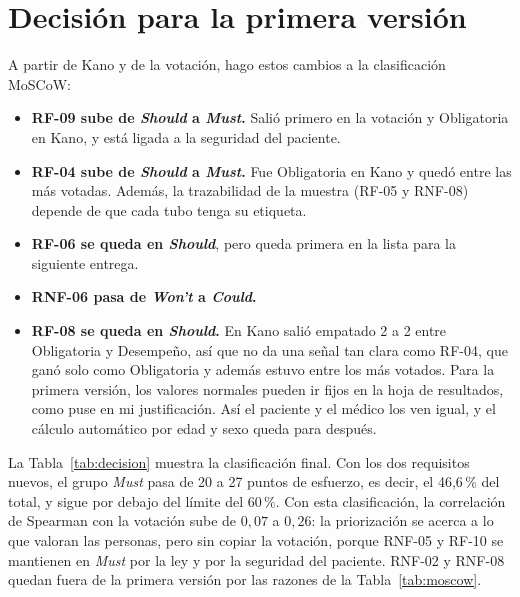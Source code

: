 \documentclass[11pt,a4paper]{article}
\begin{document}
\section{Decisión para la primera versión}
A partir de Kano y de la votación, hago estos cambios a la clasificación MoSCoW:

\begin{itemize}
\item \textbf{RF-09 sube de \emph{Should} a \emph{Must}.} Salió primero en la votación y Obligatoria en Kano, y está ligada a la seguridad del paciente.
\item \textbf{RF-04 sube de \emph{Should} a \emph{Must}.} Fue Obligatoria en Kano y quedó entre las más votadas. Además, la trazabilidad de la muestra (RF-05 y RNF-08) depende de que cada tubo tenga su etiqueta.
\item \textbf{RF-06 se queda en \emph{Should}}, pero queda primera en la lista para la siguiente entrega.
\item \textbf{RNF-06 pasa de \emph{Won't} a \emph{Could}.}
\item \textbf{RF-08 se queda en \emph{Should}.} En Kano salió empatado 2 a 2 entre Obligatoria y Desempeño, así que no da una señal tan clara como RF-04, que ganó solo como Obligatoria y además estuvo entre los más votados. Para la primera versión, los valores normales pueden ir fijos en la hoja de resultados, como puse en mi justificación. Así el paciente y el médico los ven igual, y el cálculo automático por edad y sexo queda para después.
\end{itemize}

La Tabla~\ref{tab:decision} muestra la clasificación final. Con los dos requisitos nuevos, el grupo \emph{Must} pasa de 20 a 27 puntos de esfuerzo, es decir, el 46,6\,\% del total, y sigue por debajo del límite del 60\,\%. Con esta clasificación, la correlación de Spearman con la votación sube de $0{,}07$ a $0{,}26$: la priorización se acerca a lo que valoran las personas, pero sin copiar la votación, porque RNF-05 y RF-10 se mantienen en \emph{Must} por la ley y por la seguridad del paciente. RNF-02 y RNF-08 quedan fuera de la primera versión por las razones de la Tabla~\ref{tab:moscow}.
\end{document}
